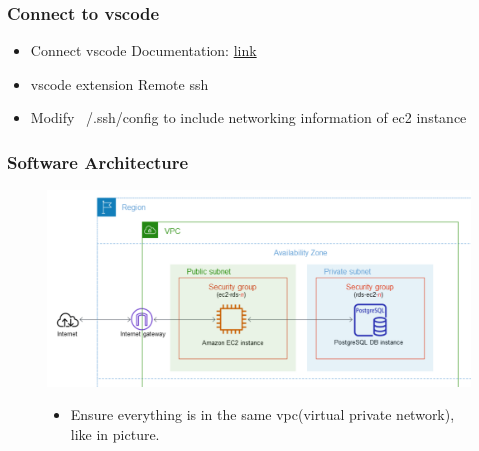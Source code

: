 \documentclass{beamer}
\begin{document}
\begin{frame}\frametitle{Connect to vscode}
\begin{itemize}
\item Connect vscode Documentation: \href{https://medium.com/@christyjacob4/using-vscode-remotely-on-an-ec2-instance-7822c4032cff}{link}
\item vscode extension Remote ssh
\item Modify ~/.ssh/config to include networking information of ec2 instance
\end{itemize}
\end{frame}


\begin{frame}\frametitle{Software Architecture}
\begin{figure}
\includegraphics[width=12cm]{software_architecture.png}
\begin{itemize}
\item Ensure everything is in the same vpc(virtual private network), like in picture.
\end{itemize}
\end{figure}  
\end{frame}
\end{document}

